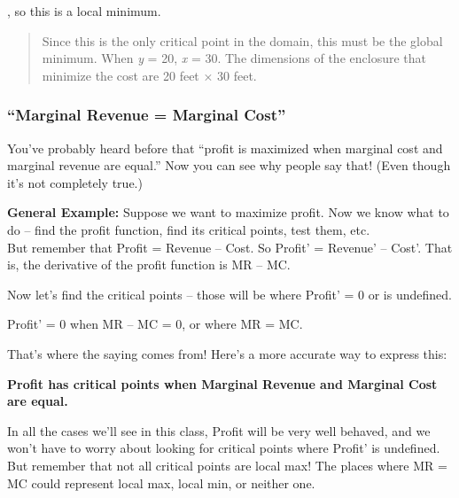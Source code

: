 , so this is a local minimum.

\begin{quote}
Since this is the only critical point in the domain, this must be the
global minimum. When \emph{y} = 20, \emph{x} = 30. The dimensions of the
enclosure that minimize the cost are 20 feet × 30 feet.
\end{quote}

\subsubsection{ ``Marginal Revenue = Marginal
Cost''}\label{marginal-revenue-marginal-cost}

You've probably heard before that ``profit is maximized when marginal
cost and marginal revenue are equal.'' Now you can see why people say
that! (Even though it's not completely true.)

\textbf{General Example:} Suppose we want to maximize profit. Now we
know what to do -- find the profit function, find its critical points,
test them, etc.\\
But remember that Profit = Revenue -- Cost. So Profit' = Revenue' --
Cost'. That is, the derivative of the profit function is MR -- MC.

Now let's find the critical points -- those will be where Profit' = 0 or
is undefined.

Profit' = 0 when MR -- MC = 0, or where MR = MC.

That's where the saying comes from! Here's a more accurate way to
express this:

\textbf{Profit has critical points when Marginal Revenue and Marginal
Cost are equal. }

In all the cases we'll see in this class, Profit will be very well
behaved, and we won't have to worry about looking for critical points
where Profit' is undefined. But remember that not all critical points
are local max! The places where MR = MC could represent local max, local
min, or neither one.


